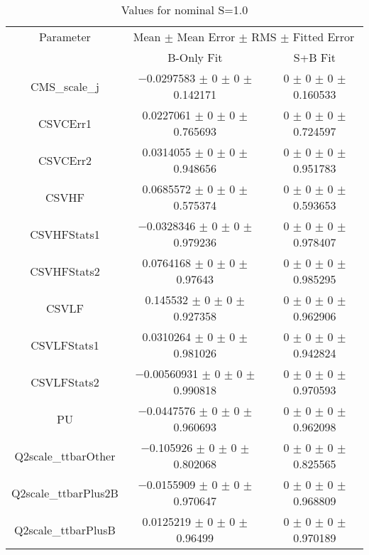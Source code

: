 \begin{table}
\centering
\caption{Values for nominal S=1.0}
\begin{tabular}{ccc}
\toprule
Parameter & \multicolumn{2}{c}{Mean $\pm$ Mean Error $\pm$ RMS $\pm$ Fitted Error}\\
 & B-Only Fit & S+B Fit\\
\midrule
CMS\_scale\_j & \num{-0.0297583} $\pm$ \num{0} $\pm$ \num{0} $\pm$ \num{0.142171} & \num{0} $\pm$ \num{0} $\pm$ \num{0} $\pm$ \num{0.160533}\\
CSVCErr1 & \num{0.0227061} $\pm$ \num{0} $\pm$ \num{0} $\pm$ \num{0.765693} & \num{0} $\pm$ \num{0} $\pm$ \num{0} $\pm$ \num{0.724597}\\
CSVCErr2 & \num{0.0314055} $\pm$ \num{0} $\pm$ \num{0} $\pm$ \num{0.948656} & \num{0} $\pm$ \num{0} $\pm$ \num{0} $\pm$ \num{0.951783}\\
CSVHF & \num{0.0685572} $\pm$ \num{0} $\pm$ \num{0} $\pm$ \num{0.575374} & \num{0} $\pm$ \num{0} $\pm$ \num{0} $\pm$ \num{0.593653}\\
CSVHFStats1 & \num{-0.0328346} $\pm$ \num{0} $\pm$ \num{0} $\pm$ \num{0.979236} & \num{0} $\pm$ \num{0} $\pm$ \num{0} $\pm$ \num{0.978407}\\
CSVHFStats2 & \num{0.0764168} $\pm$ \num{0} $\pm$ \num{0} $\pm$ \num{0.97643} & \num{0} $\pm$ \num{0} $\pm$ \num{0} $\pm$ \num{0.985295}\\
CSVLF & \num{0.145532} $\pm$ \num{0} $\pm$ \num{0} $\pm$ \num{0.927358} & \num{0} $\pm$ \num{0} $\pm$ \num{0} $\pm$ \num{0.962906}\\
CSVLFStats1 & \num{0.0310264} $\pm$ \num{0} $\pm$ \num{0} $\pm$ \num{0.981026} & \num{0} $\pm$ \num{0} $\pm$ \num{0} $\pm$ \num{0.942824}\\
CSVLFStats2 & \num{-0.00560931} $\pm$ \num{0} $\pm$ \num{0} $\pm$ \num{0.990818} & \num{0} $\pm$ \num{0} $\pm$ \num{0} $\pm$ \num{0.970593}\\
PU & \num{-0.0447576} $\pm$ \num{0} $\pm$ \num{0} $\pm$ \num{0.960693} & \num{0} $\pm$ \num{0} $\pm$ \num{0} $\pm$ \num{0.962098}\\
Q2scale\_ttbarOther & \num{-0.105926} $\pm$ \num{0} $\pm$ \num{0} $\pm$ \num{0.802068} & \num{0} $\pm$ \num{0} $\pm$ \num{0} $\pm$ \num{0.825565}\\
Q2scale\_ttbarPlus2B & \num{-0.0155909} $\pm$ \num{0} $\pm$ \num{0} $\pm$ \num{0.970647} & \num{0} $\pm$ \num{0} $\pm$ \num{0} $\pm$ \num{0.968809}\\
Q2scale\_ttbarPlusB & \num{0.0125219} $\pm$ \num{0} $\pm$ \num{0} $\pm$ \num{0.96499} & \num{0} $\pm$ \num{0} $\pm$ \num{0} $\pm$ \num{0.970189}\\

\end{tabular}
\end{table}
